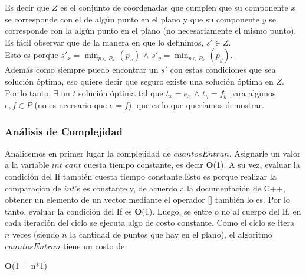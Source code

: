 \indent Es decir que $Z$ es el conjunto de coordenadas que cumplen que su componente $x$ se corresponde con el de alg\'un punto en el plano y que su componente $y$ se corresponde con la alg\'un punto en el plano (no necesariamente el mismo punto).\\

\indent Es fácil observar que de la manera en que lo definimos, $s' \in Z $.\\ 
\indent Esto es porque $s'_{x} =  \min_{p \in P_{s'}}(p_{x})$  $\wedge$  $s'_{y} =  \min_{p \in P_{s'}}(p_{y})$. \\
\indent  Adem\'as como siempre puedo encontrar un $s'$ con estas condiciones que sea soluci\'on \'optima, eso quiere decir que seguro existe una soluci\'on \'optima en $Z$.\\
\indent Por lo tanto, $\exists$ un $t$ soluci\'on \'optima tal que $t_{x} = e_{x}$ $\wedge$ $t_{y}=f_{y}$ para algunos $e,f \in P$ (no es necesario que $e=f$), que es lo que quer\'iamos demostrar.\\







			








\subsubsection{Análisis de Complejidad}

\indent Analicemos en primer lugar la complejidad de $cuantosEntran$. Asignarle un valor a la variable $int$ $cant$ cuesta tiempo constante, es decir \textbf{O}(1). A su vez, evaluar la condición del If también cuesta tiempo constante.Esto es porque realizar la comparaci\'on de $int$'s es constante y, de acuerdo a la documentaci\'on de C++, obtener un elemento de un vector mediante el operador [] tambi\'en lo es. Por lo tanto, evaluar la condición del If es \textbf{O}(1). Luego, se entre o no al cuerpo del If, en cada iteraci\'on del ciclo se ejecuta algo de costo constante. Como el ciclo se itera $n$ veces (siendo $n$ la cantidad de puntos que hay en el plano), el algoritmo $cuantosEntran$ tiene un costo de\\
\begin{center}
\textbf{O}(1 + n*1)
\end{center}\\


